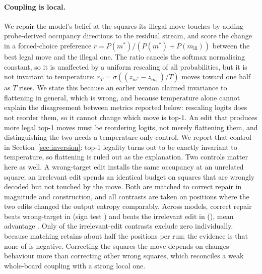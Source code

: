\documentclass[11pt]{article}
\begin{document}
\paragraph{Coupling is local.}
We repair the model's belief at the squares its illegal move touches by adding
probe-derived occupancy directions to the residual stream, and score the change in
a forced-choice preference $r = P(m^\ast)/(P(m^\ast)+P(m_{\mathrm{ill}}))$ between
the best legal move and the illegal one. The ratio cancels the softmax normalising
constant, so it is unaffected by a uniform rescaling of all probabilities, but it is
not invariant to temperature: $r_T = \sigma((z_{m^\ast} - z_{m_{\mathrm{ill}}})/T)$ moves
toward one half as $T$ rises. We state this because an earlier version claimed
invariance to flattening in general, which is wrong, and because temperature alone
cannot explain the disagreement between metrics reported below: rescaling logits
does not reorder them, so it cannot change which move is top-1. An edit that
produces more legal top-1 moves must be reordering logits, not merely flattening
them, and distinguishing the two needs a temperature-only control. We report that
control in Section~\ref{sec:inversion}: top-1 legality turns out to be exactly
invariant to temperature, so flattening is ruled out as the explanation. Two controls
matter here as well. A wrong-target edit installs the same
occupancy at an unrelated square; an irrelevant edit spends an identical budget on
squares that are wrongly decoded but not touched by the move. Both are matched to
correct repair in magnitude and construction, and all contrasts are taken on
positions where the two edits changed the output entropy comparably. Across
 models, correct repair beats wrong-target in
 (sign test ) and beats the irrelevant edit in
 (), mean advantage . Only
 of the irrelevant-edit contrasts exclude zero individually,
because matching retains about half the positions per run; the evidence is that
none of  is negative. Correcting the squares the move depends on
changes behaviour more than correcting other wrong squares, which reconciles a
weak whole-board coupling \citep{balogh2026verification} with a strong local one.
\end{document}
